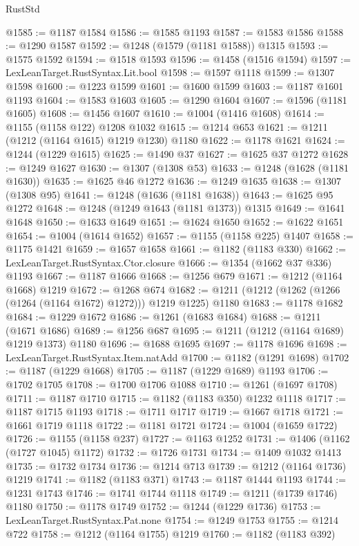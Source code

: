 \begin{lexlean}{RustStd}
\begin{coremodule}
@1585 := @1187 @1584
@1586 := @1585 @1193
@1587 := @1583 @1586
@1588 := @1290 @1587
@1592 := @1248 (@1579 (@1181 @1588)) @1315
@1593 := @1575 @1592
@1594 := @1518 @1593
@1596 := @1458 (@1516 @1594)
@1597 := LexLeanTarget.RustSyntax.Lit.bool
@1598 := @1597 @1118
@1599 := @1307 @1598
@1600 := @1223 @1599
@1601 := @1600 @1599
@1603 := @1187 @1601 @1193
@1604 := @1583 @1603
@1605 := @1290 @1604
@1607 := @1596 (@1181 @1605)
@1608 := @1456 @1607
@1610 := @1004 (@1416 @1608)
@1614 := @1155 (@1158 @122) @1208 @1032
@1615 := @1214 @653
@1621 := @1211 (@1212 (@1164 @1615) @1219 @1230) @1180
@1622 := @1178 @1621
@1624 := @1244 (@1229 @1615)
@1625 := @1490 @37
@1627 := @1625 @37 @1272
@1628 := @1249 @1627
@1630 := @1307 (@1308 @53)
@1633 := @1248 (@1628 (@1181 @1630))
@1635 := @1625 @46 @1272
@1636 := @1249 @1635
@1638 := @1307 (@1308 @95)
@1641 := @1248 (@1636 (@1181 @1638))
@1643 := @1625 @95 @1272
@1648 := @1248 (@1249 @1643 (@1181 @1373)) @1315
@1649 := @1641 @1648
@1650 := @1633 @1649
@1651 := @1624 @1650
@1652 := @1622 @1651
@1654 := @1004 (@1614 @1652)
@1657 := @1155 (@1158 @225) @1407
@1658 := @1175 @1421
@1659 := @1657 @1658
@1661 := @1182 (@1183 @330)
@1662 := LexLeanTarget.RustSyntax.Ctor.closure
@1666 := @1354 (@1662 @37 @336) @1193
@1667 := @1187 @1666
@1668 := @1256 @679
@1671 := @1212 (@1164 @1668) @1219
@1672 := @1268 @674
@1682 := @1211 (@1212 (@1262 (@1266 (@1264 (@1164 @1672) @1272))) @1219 @1225) @1180
@1683 := @1178 @1682
@1684 := @1229 @1672
@1686 := @1261 (@1683 @1684)
@1688 := @1211 (@1671 @1686)
@1689 := @1256 @687
@1695 := @1211 (@1212 (@1164 @1689) @1219 @1373) @1180
@1696 := @1688 @1695
@1697 := @1178 @1696
@1698 := LexLeanTarget.RustSyntax.Item.natAdd
@1700 := @1182 (@1291 @1698)
@1702 := @1187 (@1229 @1668)
@1705 := @1187 (@1229 @1689) @1193
@1706 := @1702 @1705
@1708 := @1700 @1706 @1088
@1710 := @1261 (@1697 @1708)
@1711 := @1187 @1710
@1715 := @1182 (@1183 @350) @1232 @1118
@1717 := @1187 @1715 @1193
@1718 := @1711 @1717
@1719 := @1667 @1718
@1721 := @1661 @1719 @1118
@1722 := @1181 @1721
@1724 := @1004 (@1659 @1722)
@1726 := @1155 (@1158 @237)
@1727 := @1163 @1252
@1731 := @1406 (@1162 (@1727 @1045) @1172)
@1732 := @1726 @1731
@1734 := @1409 @1032 @1413
@1735 := @1732 @1734
@1736 := @1214 @713
@1739 := @1212 (@1164 @1736) @1219
@1741 := @1182 (@1183 @371)
@1743 := @1187 @1444 @1193
@1744 := @1231 @1743
@1746 := @1741 @1744 @1118
@1749 := @1211 (@1739 @1746) @1180
@1750 := @1178 @1749
@1752 := @1244 (@1229 @1736)
@1753 := LexLeanTarget.RustSyntax.Pat.none
@1754 := @1249 @1753
@1755 := @1214 @722
@1758 := @1212 (@1164 @1755) @1219
@1760 := @1182 (@1183 @392)

\end{coremodule}
\end{lexlean}

